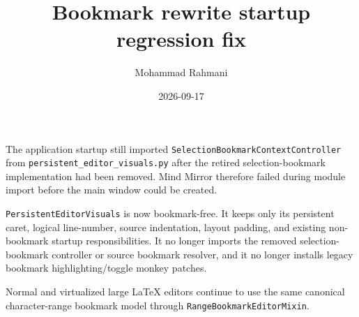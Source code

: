 \documentclass[a4paper]{article}
\title{Bookmark rewrite startup regression fix}
\date{2026-09-17}
\author{Mohammad Rahmani}
\begin{document}
   \maketitle

   \begin{preview}
      The application startup still imported
      \texttt{SelectionBookmarkContextController} from
      \texttt{persistent\_editor\_visuals.py} after the retired selection-bookmark
      implementation had been removed.  Mind Mirror therefore failed during
      module import before the main window could be created.

      \texttt{PersistentEditorVisuals} is now bookmark-free.  It keeps only its
      persistent caret, logical line-number, source indentation, layout padding,
      and existing non-bookmark startup responsibilities.  It no longer imports
      the removed selection-bookmark controller or source bookmark resolver, and
      it no longer installs legacy bookmark highlighting/toggle monkey patches.

      Normal and virtualized large LaTeX editors continue to use the same
      canonical character-range bookmark model through
      \texttt{RangeBookmarkEditorMixin}.
   \end{preview}

   
   
\end{document}
